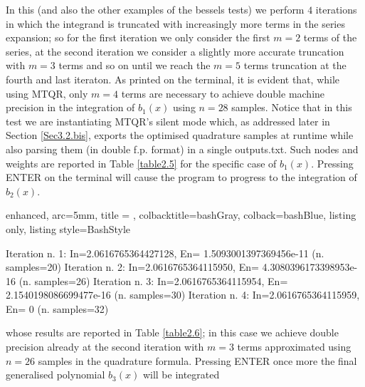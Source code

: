 \documentclass[a4paper, twosided]{book}
\begin{document}
\noindent
In this (and also the other examples of the \colorbox{poliGrayBlue}{bessels} tests) we perform $4$ iterations in which the integrand is truncated with increasingly more terms in the series expansion; so for the first iteration we only consider the first $m=2$ terms of the series, at the second iteration we consider a slightly more accurate truncation with $m=3$ terms and so on until we reach the $m=5$ terms truncation at the fourth and last iteraton. As printed on the terminal, it is evident that, while using MTQR, only $m=4$ terms are necessary to achieve double machine precision in the integration of $b_1(x)$ using $n=28$ samples. Notice that in this test we are instantiating MTQR's silent mode which, as addressed later in Section \ref{Sec3.2.bis}, exports the optimised quadrature samples at runtime while also parsing them (in double f.p. format) in a single \colorbox{poliGrayBlue}{outputs.txt}. Such nodes and weights are reported in Table \ref{table2.5} for the specific case of $b_1(x)$. Pressing \colorbox{poliGrayBlue}{ENTER} on the terminal will cause the program to progress to the integration of $b_2(x)$. 

\vspace{0.2cm}
\begin{tcblisting}{enhanced,
                   arc=5mm,
                   title = \color{black}{\large \ttfamily Executing the bessels test case: b\_2(x)},
                   colbacktitle=bashGray,
                   colback=bashBlue,
                   listing only,
                   listing style=BashStyle}

Iteration n. 1:  In=2.0616765364427128, En= 1.5093001397369456e-11   (n. samples=20)
Iteration n. 2:  In=2.0616765364115950, En= 4.3080396173398953e-16   (n. samples=26)
Iteration n. 3:  In=2.0616765364115954, En= 2.1540198086699477e-16   (n. samples=30)
Iteration n. 4:  In=2.0616765364115959, En= 0   (n. samples=32)

\end{tcblisting}
\vspace{0.3cm}

\noindent
whose results are reported in Table \ref{table2.6}; in this case we achieve double precision already at the second iteration with $m=3$ terms approximated using $n=26$ samples in the quadrature formula. Pressing \colorbox{poliGrayBlue}{ENTER} once more the final generalised polynomial $b_3(x)$ will be integrated
\end{document}
